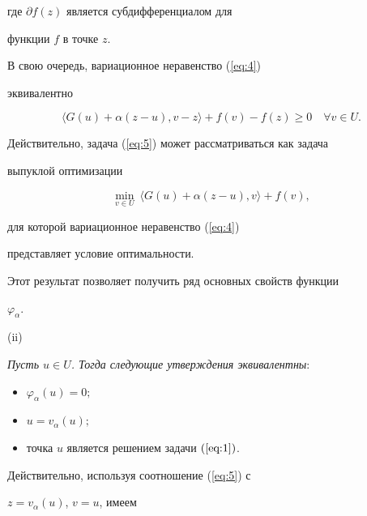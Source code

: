 где $\partial f(z)$ является субдифференциалом для 


функции $f$ в точке $z$.


В свою очередь, вариационное неравенство (\ref{eq:4}) 


эквивалентно


\begin{equation} \label{eq:5}


\langle G(u) + \alpha (z-u), v-z \rangle +


f(v)-f(z) \geq 0 \quad \forall v \in U.


\end{equation}


Действительно, задача (\ref{eq:5}) может рассматриваться как задача 


выпуклой оптимизации


$$


\min_{v \in U} \ \langle G(u) + \alpha (z-u), v \rangle + f(v),


$$


для которой вариационное неравенство (\ref{eq:4}) 


представляет условие оптимальности.





Этот результат позволяет получить ряд основных свойств функции 


$\varphi_{\alpha }$.





(ii) {\it Пусть $u \in U$. Тогда следующие утверждения эквивалентны$:$


\begin{itemize}


\item[{a)}] $ \varphi_{\alpha }(u) = 0;$


\item[{b)}] $u= v_{\alpha }(u);$


\item[{c)}] точка $u$ является решением задачи $(\ref{eq:1})$.


\end{itemize}


}





\noindent Действительно, используя соотношение (\ref{eq:5}) с


$z=v_{\alpha }(u)$, $ v= u$, имеем


$$


